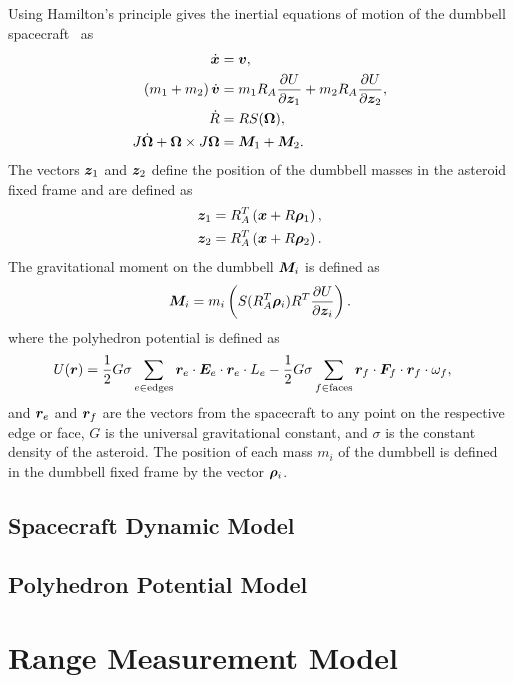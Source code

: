 \documentclass[letterpaper, paper,11pt]{AAS}		%
\begin{document}
Using Hamilton's principle gives the inertial equations of motion of the dumbbell spacecraft~\cite{kulumani2017b} as
\begin{align}
    \dot{\bm{x}} &= \bm{v}, \\
    \left( m_1 + m_2 \right) \dot{\bm{v}} &= m_1 R_A \frac{\partial U}{\partial \bm{z}_1} + m_2 R_A \frac{\partial U}{\partial \bm{z}_2}, \\
    \dot{R} &= R S(\bm{\Omega}) , \\
    J \dot{\bm{\Omega}} + \bm{\Omega} \times J \bm{\Omega} &= \bm{M}_1 + \bm{M}_2.
\end{align}
The vectors \( \bm{z}_1 \) and \( \bm{z}_2\) define the position of the dumbbell masses in the asteroid fixed frame and are defined as
\begin{align}
    \bm{z}_1 &= R_A^T \left( \bm{x} + R \bm{\rho}_1 \right) , \\
    \bm{z}_2 &= R_A^T \left( \bm{x} + R \bm{\rho}_2 \right).
\end{align}
The gravitational moment on the dumbbell \( \bm{M}_i\) is defined as
\begin{align}
    \bm{M}_i = m_i \left( S(R_A^T \bm{\rho}_i) R^T \frac{\partial U}{\partial \bm{z}_i} \right).
\end{align}
where the polyhedron potential is defined as 
\begin{align}
    U(\bm{r}) &= \frac{1}{2} G \sigma \sum_{e \in \text{edges}} \bm{r}_e \cdot \bm{E}_e \cdot \bm{r}_e \cdot L_e - \frac{1}{2}G \sigma \sum_{f \in \text{faces}} \bm{r}_f \cdot \bm{F}_f \cdot \bm{r}_f \cdot \omega_f,
\end{align}
and \( \bm{r}_e\) and \(\bm{r}_f \) are the vectors from the spacecraft to any point on the respective edge or face, \( G\) is the universal gravitational constant, and \( \sigma \) is the constant density of the asteroid.
The position of each mass \(m_i\) of the dumbbell is defined in the dumbbell fixed frame by the vector \(\bm{\rho}_i\). 

\subsection{Spacecraft Dynamic Model}

\subsection{Polyhedron Potential Model}

\section{Range Measurement Model}
\end{document}
